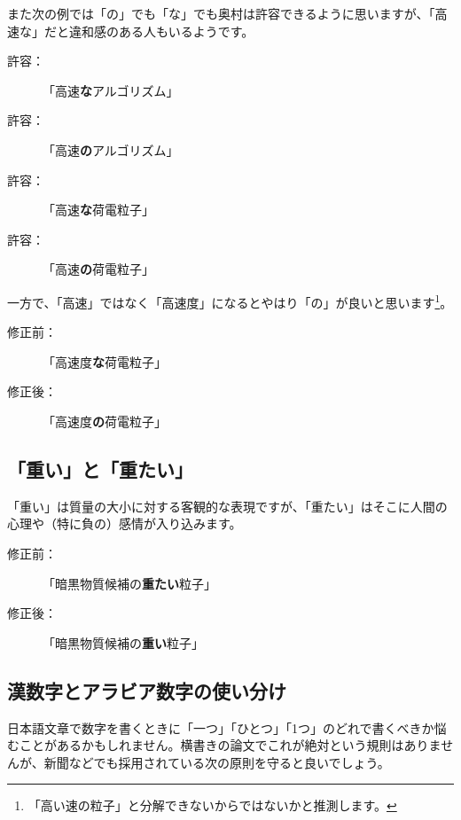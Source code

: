 また次の例では「の」でも「な」でも奥村は許容できるように思いますが、「高速な」だと違和感のある人もいるようです。
\begin{description}
\item[許容：]「高速\textbf{な}アルゴリズム」
\item[許容：]「高速\textbf{の}アルゴリズム」
\end{description}

\begin{description}
\item[許容：]「高速\textbf{な}荷電粒子」
\item[許容：]「高速\textbf{の}荷電粒子」
\end{description}

一方で、「高速」ではなく「高速度」になるとやはり「の」が良いと思います\footnote{「高い速の粒子」と分解できないからではないかと推測します。}。

\begin{description}
\item[修正前：]「高速度\textbf{な}荷電粒子」
\item[修正後：]「高速度\textbf{の}荷電粒子」
\end{description}

\subsection{「重い」と「重たい」}

「重い」は質量の大小に対する客観的な表現ですが、「重たい」はそこに人間の心理や（特に負の）感情が入り込みます。

\begin{description}
\item[修正前：]「暗黒物質候補の\textbf{重たい}粒子」
\item[修正後：]「暗黒物質候補の\textbf{重い}粒子」
\end{description}

\subsection{漢数字とアラビア数字の使い分け}

日本語文章で数字を書くときに「一つ」「ひとつ」「1つ」のどれで書くべきか悩むことがあるかもしれません。横書きの論文でこれが絶対という規則はありませんが、新聞などでも採用されている次の原則を守ると良いでしょう。

